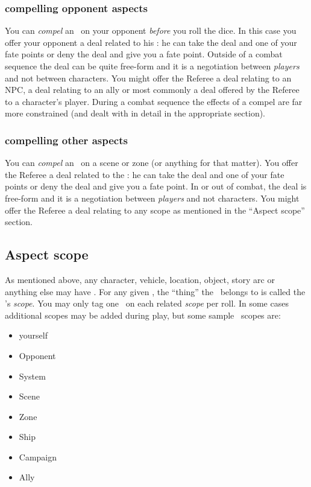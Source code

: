 \subsubsection{compelling opponent aspects}

You can \emph{compel} an \Aspect\ on your opponent 
\emph{before} you roll the dice. In this case you offer your opponent a deal 
related to his \Aspect: he can take the deal and one of your fate points or 
deny the deal and give you a fate point. Outside of a combat sequence the deal 
can be quite free-form and it is a negotiation between \emph{players} and not 
between characters. You might offer the Referee a deal relating to an NPC, a 
deal relating to an ally or most commonly a deal offered by the Referee to a 
character's player. During a combat sequence the effects of a compel are far 
more constrained (and dealt with in detail in the appropriate section).

\subsubsection{compelling other aspects}

You can \emph{compel} an \Aspect\ on a scene or zone (or anything for that 
matter). You offer the Referee a deal related to the \Aspect: he can take the 
deal and one of your fate points or deny the deal and give you a fate point. 
In or out of combat, the deal is free-form and it is a negotiation between 
\emph{players} and not characters. You might offer the Referee a deal relating 
to any scope as mentioned in the ``Aspect scope'' section.

\subsection{Aspect scope}

As mentioned above, any character, vehicle, location, object, story arc or 
anything else may have \Aspects. For any given \Aspect, the ``thing'' the 
\Aspect\ belongs to is called the \Aspect's \emph{scope}. You may only tag one 
\Aspect\ on each related \emph{scope} per roll. In some 
cases additional scopes may be added during play, but some sample \Aspect\ 
scopes are:

\begin{itemize}
\item yourself
\item Opponent
\item System
\item Scene
\item Zone
\item Ship
\item Campaign
\item Ally
\end{itemize}

